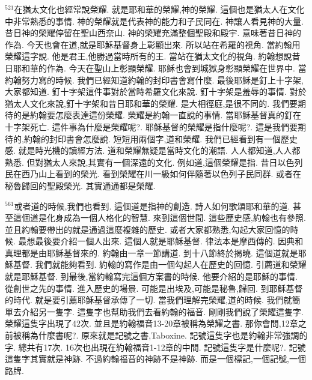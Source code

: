 \documentclass{book}
\begin{document}
$^{521}$在猶太文化也經常說榮耀.
就是耶和華的榮耀,神的榮耀.
這個也是猶太人在文化中非常熟悉的事情.
神的榮耀就是代表神的能力和子民同在.
神讓人看見神的大量.
昔日神的榮耀停留在聖山西奈山.
神的榮耀充滿整個聖殿和殿宇.
意味著昔日神的作為.
今天也會在道,就是耶穌基督身上彰顯出來.
所以站在希羅的視角.
當約翰用榮耀這字說.
他是君王,他勝過當時所有的王.
當站在猶太文化的視角.
約翰想說昔日耶和華的作為.
今天在聖山上彰顯榮耀.
耶穌也會到城獄身彰顯榮耀在世界中.
當約翰努力寫的時候.
我們已經知道約翰的封印書會寫什麼.
最後耶穌是釘上十字架,大家都知道.
釘十字架這件事對於當時希羅文化來說.
釘十字架是羞辱的事情.
對於猶太人文化來說,釘十字架和昔日耶和華的榮耀.
是大相徑庭,是很不同的.
我們要期待的是約翰要怎麼表達這份榮耀.
榮耀是約翰一直說的事情.
當耶穌基督真的釘在十字架死亡.
這件事為什麼是榮耀呢?.
耶穌基督的榮耀是指什麼呢?.
這是我們要期待的,約翰的封印書會怎麼說.
短短用兩個字,道和榮耀.
我們已經看到有一個歷史感.
就是時光機的讀經方法.
道和榮耀無疑是當時文化的潮語.
人人都知道,人人都熟悉.
但對猶太人來說,其實有一個深遠的文化.
例如道,這個榮耀是指.
昔日以色列民在西乃山上看到的榮光.
看到榮耀在川一級如何伴隨著以色列子民同群.
或者在秘魯歸回的聖殿榮光.
其實通通都是榮耀.

$^{561}$或者道的時候,我們也看到.
這個道是指神的創造.
詩人如何歌頌耶和華的道.
甚至這個道是化身成為一個人格化的智慧.
來到這個世間.
這些歷史感,約翰也有參照.
並且約翰要帶出的就是通過這麼複雜的歷史.
或者大家都熟悉,勾起大家回憶的時候.
最想最後要介紹一個人出來.
這個人就是耶穌基督.
律法本是摩西傳的.
因典和真理都是由耶穌基督來的.
約翰由一章一節講道.
到十八節終於揭曉.
這個道就是耶穌基督.
我們就能夠看到.
約翰的寫作是由一個勾起人在歷史的回憶.
引薦道和榮耀就是耶穌基督.
到最後,當約翰寫完這個方案書的時候.
他要介紹的是耶穌的事情.
從創世之先的事情.
進入歷史的場景.
可能是出埃及,可能是秘魯,歸回.
到耶穌基督的時代.
就是要引薦耶穌基督承傳了一切.
當我們理解完榮耀,道的時候.
我們就簡單去介紹另一隻字.
這隻字也幫助我們去看約翰的福音.
剛剛我們說了榮耀這隻字.
榮耀這隻字出現了42次.
並且是約翰福音13-20章被稱為榮耀之書.
那你會問,12章之前被稱為什麼書呢?.
原來就是記號之書,Taboxine.
記號這隻字也是約翰非常強調的字.
總共有17次.
16次也出現在約翰福音1-12章的中間.
記號這隻字是什麼呢?.
記號這隻字其實就是神跡.
不過約翰福音的神跡不是神跡.
而是一個標記,一個記號,一個路牌.
\end{document}
